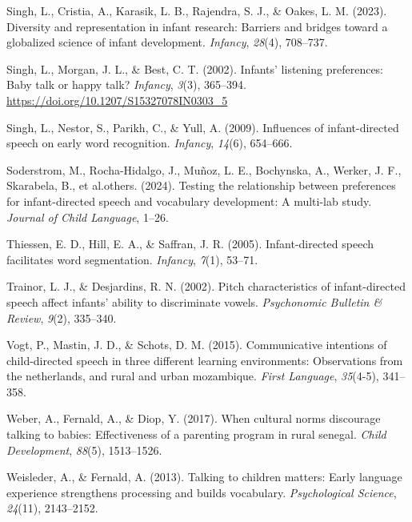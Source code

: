 \documentclass[
  ,man,floatsintext]{apa6}
\newlength{\cslhangindent}
\newlength{\cslentryspacingunit} %
\newenvironment{CSLReferences}[2] %
 {%
  \setlength{\parindent}{0pt}
  \ifodd #1
  \let\oldpar\par
  \def\par{\hangindent=\cslhangindent\oldpar}
  \fi
  \setlength{\parskip}{#2\cslentryspacingunit}
 }%
 {}
\begin{document}
\begin{CSLReferences}{1}{0}
\leavevmode{}%
Singh, L., Cristia, A., Karasik, L. B., Rajendra, S. J., \& Oakes, L. M. (2023). Diversity and representation in infant research: Barriers and bridges toward a globalized science of infant development. \emph{Infancy}, \emph{28}(4), 708--737.

\leavevmode{}%
Singh, L., Morgan, J. L., \& Best, C. T. (2002). Infants' listening preferences: Baby talk or happy talk? \emph{Infancy}, \emph{3}(3), 365--394. \url{https://doi.org/10.1207/S15327078IN0303_5}

\leavevmode{}%
Singh, L., Nestor, S., Parikh, C., \& Yull, A. (2009). Influences of infant-directed speech on early word recognition. \emph{Infancy}, \emph{14}(6), 654--666.

\leavevmode{}%
Soderstrom, M., Rocha-Hidalgo, J., Muñoz, L. E., Bochynska, A., Werker, J. F., Skarabela, B., et al.others. (2024). Testing the relationship between preferences for infant-directed speech and vocabulary development: A multi-lab study. \emph{Journal of Child Language}, 1--26.

\leavevmode{}%
Thiessen, E. D., Hill, E. A., \& Saffran, J. R. (2005). Infant-directed speech facilitates word segmentation. \emph{Infancy}, \emph{7}(1), 53--71.

\leavevmode{}%
Trainor, L. J., \& Desjardins, R. N. (2002). Pitch characteristics of infant-directed speech affect infants' ability to discriminate vowels. \emph{Psychonomic Bulletin \& Review}, \emph{9}(2), 335--340.

\leavevmode{}%
Vogt, P., Mastin, J. D., \& Schots, D. M. (2015). Communicative intentions of child-directed speech in three different learning environments: Observations from the netherlands, and rural and urban mozambique. \emph{First Language}, \emph{35}(4-5), 341--358.

\leavevmode{}%
Weber, A., Fernald, A., \& Diop, Y. (2017). When cultural norms discourage talking to babies: Effectiveness of a parenting program in rural senegal. \emph{Child Development}, \emph{88}(5), 1513--1526.

\leavevmode{}%
Weisleder, A., \& Fernald, A. (2013). Talking to children matters: Early language experience strengthens processing and builds vocabulary. \emph{Psychological Science}, \emph{24}(11), 2143--2152.


\end{CSLReferences}
\end{document}
